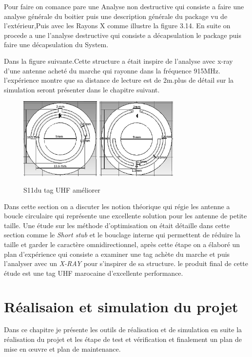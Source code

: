 \documentclass[11pt, a4paper, twoside]{book}
\begin{document}
Pour faire on comance pare une Analyse non destructive qui consiste a faire une analyse générale  du boitier puis une description générale du package vu de l’extérieur,Puis avec les Rayons X comme illustre la figure 3.14. En suite on procede a une l'analyse destructive qui consiste a décapsulation le package puis faire une décapsulation du System.



Dans la figure suivante.Cette structure a était inspire de l'analyse avec x-ray d'une antenne acheté du marche qui rayonne dans la fréquence 915MHz. l'expérience montre que sa distance de lecture est de 2m.plus de détail sur la simulation seront présenter dans le chapitre suivant.\\

\begin{figure}[H]
\centering
\includegraphics[width=4cm]{front11}
\includegraphics[width=4cm]{back22}
\caption{S11du tag UHF améliorer }
\end{figure}

Dans cette section on a discuter les notion théorique qui régie les antenne a boucle circulaire qui représente une excellente solution pour les antenne de petite taille. Une étude sur les méthode d'optimisation on était détaille dans cette section comme le \emph{Short stub} et le bouclage interne qui permettent de réduire la taille et garder le caractère omnidirectionnel, après cette étape on a élaboré un plan d'expérience qui consiste a examiner une tag achète du marche et puis l'analyser avec un \emph{X-RAY} pour s'inspirer de sa structure. le produit final de cette étude est une tag UHF marocaine d'excellente performance.

\chapter{Réalisaion et simulation du projet}
Dans ce chapitre je présente les outils	de	réalisation	et de	simulation en suite la réalisation	du projet et les étape de test	 et vérification et finalement un plan de mise en œuvre et plan de maintenance.
\end{document}
